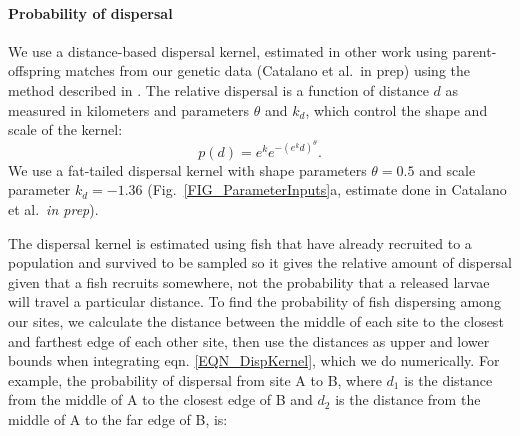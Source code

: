 \documentclass[12pt, oneside]{article}   	%
\begin{document}

\paragraph*{Probability of dispersal}

We use a distance-based dispersal kernel, estimated in other work using parent-offspring matches from our genetic data (Catalano et al.\ in prep) using the method described in \cite{bode2018estimating}. The relative dispersal is a function of distance $d$ as measured in kilometers and parameters $\theta$ and $k_d$, which control the shape and scale of the kernel:
\begin{equation}
p(d) = e^k e^{-(e^k d)^\theta}. \label{EQN_DispKernel}
\end{equation}
We use a fat-tailed dispersal kernel with shape parameters $\theta = 0.5$ and scale parameter $k_d = -1.36$ (Fig.\ \ref{FIG_ParameterInputs}a, estimate done in Catalano et al.\ \textit{in prep}).

The dispersal kernel is estimated using fish that have already recruited to a population and survived to be sampled so it gives the relative amount of dispersal given that a fish recruits somewhere, not the probability that a released larvae will travel a particular distance. To find the probability of fish dispersing among our sites, we calculate the distance between the middle of each site to the closest and farthest edge of each other site, then use the distances as upper and lower bounds when integrating eqn. \ref{EQN_DispKernel}, which we do numerically. For example, the probability of dispersal from site A to B, where $d_1$ is the distance from the middle of A to the closest edge of B and $d_2$ is the distance from the middle of A to the far edge of B, is:

\end{document}
